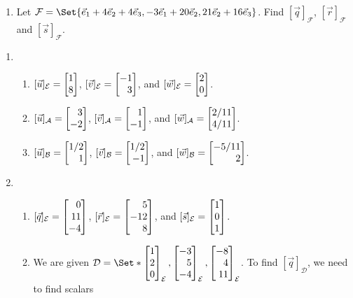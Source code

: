 \begin{exercises}
\begin{problist}
\begin{enumerate}
\begin{enumerate}
					\item Let $\mathcal F=\Set{\xhat+4\yhat+4\zhat,-3\xhat+20\yhat,21\yhat+16\zhat}$.
						Find $[\vec q]_{\mathcal F}$, $[\vec
						r]_{\mathcal F}$ and $[\vec s]_{\mathcal
						F}$.
				\end{enumerate}
		\end{enumerate}
		\begin{solution}
			\begin{enumerate}
				\item 
					\begin{enumerate}
						\item $[\vec{u}]_{\mathcal{E}} = \mat{1\\8}$,
							$[\vec{v}]_{\mathcal{E}} = \mat{-1\\3}$, and
							$[\vec{w}]_{\mathcal{E}} = \mat{2\\0}$.
						\item $[\vec{u}]_{\mathcal{A}} = \mat{3\\-2}$,
							$[\vec{v}]_{\mathcal{A}} = \mat{1\\-1}$, and
							$[\vec{w}]_{\mathcal{A}} = \mat{2/11\\4/11}$.
						\item $[\vec{u}]_{\mathcal{B}} = \mat{1/2\\1}$,
							$[\vec{v}]_{\mathcal{B}} = \mat{1/2\\-1}$, and
							$[\vec{w}]_{\mathcal{B}} = \mat{-5/11\\2}$.
					\end{enumerate}
				\item
					\begin{enumerate}
						\item $[\vec{q}]_{\mathcal{E}} = \mat{0\\11\\-4}$,
							$[\vec{r}]_{\mathcal{E}} = \mat{5\\-12 \\8}$, and
							$[\vec{s}]_{\mathcal{E}} = \mat{1\\0\\1}$.
						\item We are given $\mathcal{D} = \Set*{\mat{1\\2\\0}_{\mathcal{E}}, \mat{-3\\5\\-4}_{\mathcal{E}}, 
							\mat{-8\\4\\11}_{\mathcal{E}}}$.
							To find $[\vec{q}]_{\mathcal{D}}$, we need to find scalars 

\end{enumerate}
\end{enumerate}
\end{solution}
\end{problist}
\end{exercises}
